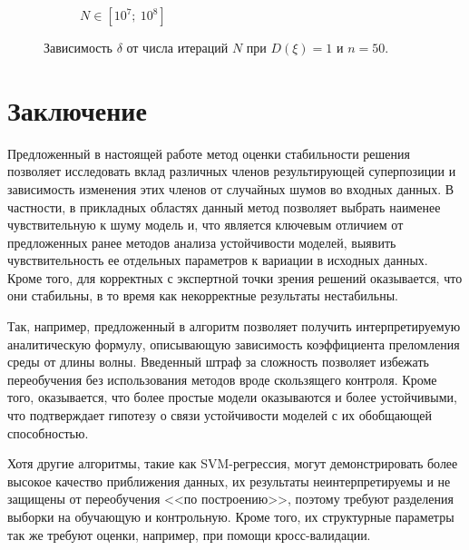 \documentclass[11pt,a4paper]{article}
\theoremstyle{definition}
\begin{document}
\begin{figure}[h!]
\begin{subfigure}[b]{0.3\textwidth}
    \caption{$N \in [10^7;~10^8]$}
    \label{fig:classic_var1_n50_end}
  \end{subfigure}
  \caption{Зависимость $\delta$ от числа итераций $N$ при $D(\xi) = 1$ и $n = 50$.}
  \label{fig:classic_var1_n50}
\end{figure}

\section{Заключение}

Предложенный в настоящей работе метод оценки стабильности решения позволяет исследовать вклад различных
членов результирующей суперпозиции и зависимость изменения этих членов от
случайных шумов во входных данных. В частности, в прикладных областях данный метод позволяет
выбрать наименее чувствительную к шуму модель и, что является ключевым отличием от предложенных
ранее методов анализа устойчивости моделей, выявить чувствительность ее отдельных
параметров к вариации в исходных данных. Кроме того, для корректных с экспертной точки зрения
решений оказывается, что они стабильны, в то время как некорректные результаты нестабильны.

Так, например, предложенный в \cite{Rudoy13} алгоритм позволяет получить интерпретируемую аналитическую
формулу, описывающую зависимость коэффициента преломления среды от длины волны.
Введенный штраф за сложность позволяет избежать переобучения без использования методов
вроде скользящего контроля. Кроме того, оказывается, что более простые модели оказываются
и более устойчивыми, что подтверждает гипотезу о связи устойчивости моделей с их обобщающей
способностью.

Хотя другие алгоритмы, такие как SVM-регрессия, могут демонстрировать более высокое
качество приближения данных, их результаты неинтерпретируемы и не защищены от переобучения
<<по построению>>, поэтому требуют разделения выборки на обучающую и контрольную. Кроме
того, их структурные параметры так же требуют оценки, например, при помощи кросс-валидации.

\FloatBarrier


%
%

\end{document}
